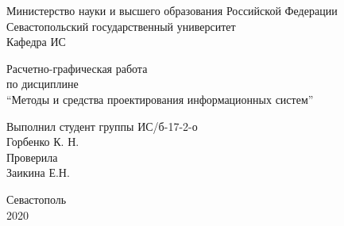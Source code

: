 \begin{titlepage}
    \thispagestyle{empty}
    
    \begin{center}
        
        Министерство науки и высшего образования Российской Федерации \\
        Севастопольский государственный университет \\
        Кафедра ИС
        
        \vfill

        Расчетно-графическая работа \\
        по дисциплине \\
        \enquote{Методы и средства проектирования информационных систем}

    \end{center}

    \vspace{1cm}

    \noindent\hspace{7.5cm} Выполнил студент группы ИС/б-17-2-о \\
    \null\hspace{7.5cm} Горбенко К. Н. \\
    \null\hspace{7.5cm} Проверила \\
    \null\hspace{7.5cm} Заикина Е.Н.

    \vfill

    \begin{center}
        Севастополь \\
        2020
    \end{center}

\end{titlepage}
